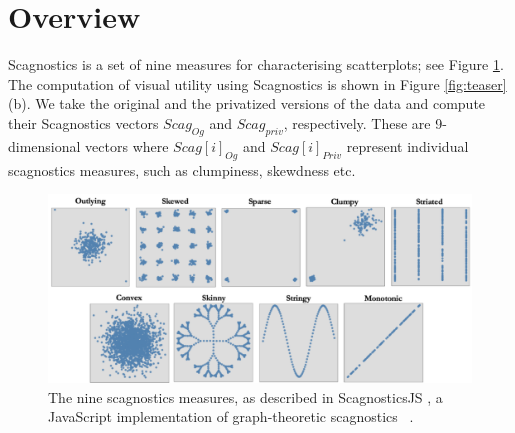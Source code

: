 \documentclass[journal]{vgtc}                     %
\begin{document}

\section{Overview}

Scagnostics \cite{Wilkinson2005} is a set of nine measures for characterising scatterplots; see Figure \ref{fig:scag_overview}. The computation of visual utility using Scagnostics is shown in Figure \ref{fig:teaser} (b). We take the original and the privatized versions of the data and compute their Scagnostics vectors $Scag_{Og}$ and $Scag_{priv}$, respectively. These are 9-dimensional vectors where $Scag[i]_{Og}$ and $Scag[i]_{Priv}$ represent individual scagnostics measures, such as clumpiness, skewdness etc.

\begin{figure}[tbp]%
  \centering %
  \includegraphics[width=\linewidth]{figs/scagnostics_overview.png}
  \caption{%
  	The nine scagnostics measures, as described in ScagnosticsJS \cite{Wilkie2020}, a JavaScript implementation of graph-theoretic scagnostics ~\cite{Wilkinson2005}. %
  }
  \label{fig:scag_overview}
\end{figure}


\end{document}
